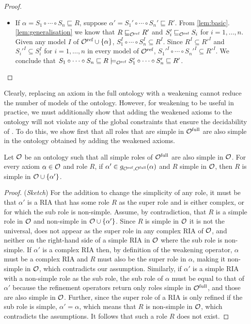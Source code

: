 \begin{proof}
\begin{itemize}
    \item If $\alpha = S_1 \circ \cdots \circ S_n \sqsubseteq R$, suppose $\alpha' = S_1' \circ \cdots \circ S_n' \sqsubseteq R'$. From \cref{lem:basic}.\ref{lem:generalisation} we know that $R \sqsubseteq_{\mathcal{O}^\textnormal{ref}} R'$ and $S_i' \sqsubseteq_{\mathcal{O}^\textnormal{ref}} S_i$ for $i = 1, \dots, n$. Given any model $I$ of ${\mathcal{O}^\textnormal{ref}} \cup \{ \alpha \}$, $S_1^I \circ \cdots \circ S_n^I \subseteq R^I$. Since $R^I \subseteq R'^I$ and $S_i'^I \subseteq S_i^I$ for $i = 1, \dots, n$ in every model of ${\mathcal{O}^\textnormal{ref}}$, $S_1'^I \circ \cdots \circ S_n'^I \subseteq R'^I$. We conclude that $S_1 \circ \cdots \circ S_n \sqsubseteq R \models_{\mathcal{O}^\textnormal{ref}} S_1' \circ \cdots \circ S_n' \sqsubseteq R'$.
  \end{itemize}
\end{proof}

Clearly, replacing an axiom in the full ontology with a weakening cannot reduce the number of models of the ontology. However, for weakening to be useful in practice, we must additionally show that adding the weakened axioms to the ontology will not violate any of the global constraints that ensure the decidability of \SROIQ. To do this, we show first that all roles that are simple in ${\mathcal{O}^\textnormal{full}}$ are also simple in the ontology obtained by adding the weakened axioms.

\begin{lemma} \label{lem:simple-roles}
  Let $\mathcal{O}$ be an ontology such that all simple roles of ${\mathcal{O}^\textnormal{full}}$ are also simple in $\mathcal{O}$. For every axiom $\alpha \in \mathcal{O}$ and role $R$, if $\alpha' \in g_{{\mathcal{O}^\textnormal{ref}},{\mathcal{O}^\textnormal{full}}}(\alpha)$ and $R$ simple in $\mathcal{O}$, then $R$ is simple in $\mathcal{O} \cup \{ \alpha' \}$.
\end{lemma}

\begin{proof}(\emph{Sketch})
  For the addition to change the simplicity of any role, it must be that $\alpha'$ is a RIA that has some role $R$ as the super role and is either complex, or for which the sub role is non-simple. Assume, by contradiction, that $R$ is a simple role in $\mathcal{O}$ and non-simple in $\mathcal{O} \cup \{ \alpha' \}$. Since $R$ is simple in $\mathcal{O}$ it is not the universal, does not appear as the super role in any complex RIA of $\mathcal{O}$, and neither on the right-hand side of a simple RIA in $\mathcal{O}$ where the sub role is non-simple. If $\alpha'$ is a complex RIA then, by definition of the weakening operator, $\alpha$ must be a complex RIA and $R$ must also be the super role in $\alpha$, making it non-simple in $\mathcal{O}$, which contradicts our assumption. Similarly, if $\alpha'$ is a simple RIA with a non-simple role as the sub role, the sub role of $\alpha$ must be equal to that of $\alpha'$ because the refinement operators return only roles simple in ${\mathcal{O}^\textnormal{full}}$, and those are also simple in $\mathcal{O}$. Further, since the super role of a RIA is only refined if the sub role is simple, $\alpha' = \alpha$, which means that $R$ is non-simple in $\mathcal{O}$, which contradicts the assumptions. It follows that such a role $R$ does not exist.
\end{proof}

